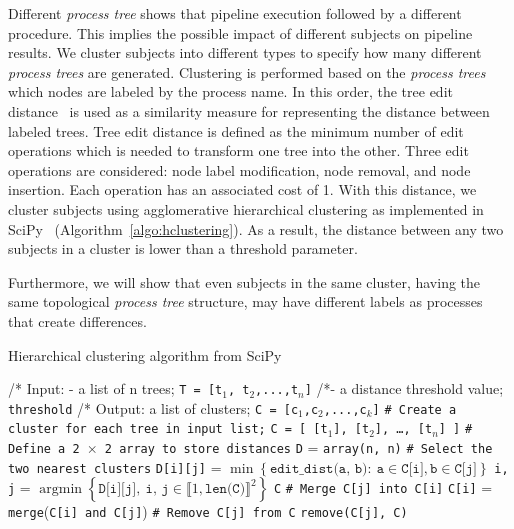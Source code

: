 \documentclass[a4paper,num-refs]{oup-contemporary}
\DeclareMathOperator*{\argmin}{argmin}
\begin{document}
Different \emph{process tree} shows that pipeline execution followed by a different procedure. 
This implies the possible impact of different subjects on pipeline results.
We cluster subjects into different types to specify how many different 
\emph{process trees} are generated. Clustering is performed based on the \emph{process trees} 
which nodes are labeled by the process name. 
In this order, 
the tree edit distance~\cite{zhang1989simple} is used as a similarity measure for 
representing the distance between labeled trees. Tree edit distance  is defined  
as the minimum number of edit operations which is needed to transform one tree into 
the other. Three edit operations are considered: node label modification, 
node removal, and node insertion. Each operation has an associated cost of 1.
With this distance, we cluster subjects using agglomerative hierarchical
clustering as implemented in SciPy~\cite{oliphant2007scipy}
(Algorithm~\ref{algo:hclustering}). As a result, the distance between
any two subjects in a cluster is lower than a threshold parameter.

Furthermore, we will show that even subjects in the same cluster, 
having the same topological \emph{process tree} structure, 
may have different labels as processes that create differences.

\begin{algorithm}[h!]
\caption{Hierarchical clustering algorithm from SciPy}
\label{algo:hclustering}
\begin{algorithmic}

  \State /* Input: - a list of n trees; \texttt{T = [t${_1}$, t${_2}$,...,t${_n}$]}
  \State /*\quad \quad \quad \quad - a distance threshold value; \texttt{threshold}
  \State /* Output: a list of clusters; \texttt{C = [c${_1}$,c${_2}$,...,c${_k}$]}
  \State \texttt{\# Create a cluster for each tree in input list;}
  \State \texttt{C = [ [t${_1}$], [t${_2}$], \ldots , [t${_n}$] ]}
  \State \texttt{\# Define a 2 $\times$ 2 array to store distances}
  \State \texttt{D} = \texttt{array(n, n)}
  \State \texttt{\# Select the two nearest clusters}
  \State \texttt{D[i][j]} = $\min \left\{ \texttt{edit\_dist(a, b)}: \ \texttt{a} \in \texttt{C[i]}, \texttt{b} \in \texttt{C[j]} \right\}$
    \EndFor
  \EndFor
  \State \texttt{i, j} = $\argmin \left\{ \texttt{D[i][j]}, \ \texttt{i, j} \in \llbracket 1, \texttt{len(C)}\rrbracket^2 \right\}$
  \State \Return \texttt{C}
  \Else
  \State \texttt{\# Merge C[j] into C[i]}
  \State \texttt{C[i]} = \texttt{merge}(\texttt{C[i] and C[j]})
  \State \texttt{\# Remove C[j] from C}
  \State \texttt{remove(C[j], C)}
  \EndIf
  \EndWhile
\end{algorithmic}
\end{algorithm}
\end{document}

